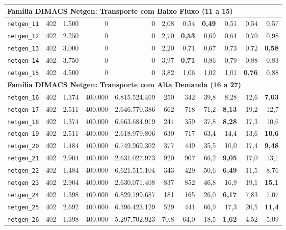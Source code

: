 \begin{longtable}{lrrrrrrrrrr}
\midrule
\multicolumn{11}{l}{\textbf{Família DIMACS Netgen: Transporte com Baixo Fluxo (11 a 15)}} \\
\midrule
\texttt{netgen\_11} & 402 & 1.500 & 0 & 0 & 2,08 & 0,54 & \textbf{0,49} & 0,51 & 0,54 & 0,57 \\
\texttt{netgen\_12} & 402 & 2.250 & 0 & 0 & 2,70 & \textbf{0,53} & 0,69 & 0,64 & 0,70 & 0,98 \\
\texttt{netgen\_13} & 402 & 3.000 & 0 & 0 & 2,20 & 0,71 & 0,67 & 0,73 & 0,72 & \textbf{0,58} \\
\texttt{netgen\_14} & 402 & 3.750 & 0 & 0 & 3,97 & \textbf{0,71} & 0,86 & 0,79 & 0,88 & 0,83 \\
\texttt{netgen\_15} & 402 & 4.500 & 0 & 0 & 3,82 & 1,06 & 1,02 & 1,01 & \textbf{0,76} & 0,88 \\
\midrule
\multicolumn{11}{l}{\textbf{Família DIMACS Netgen: Transporte com Alta Demanda (16 a 27)}} \\
\midrule
\texttt{netgen\_16} & 402 & 1.374 & 400.000 & 6.815.524.469 & 250 & 342 & 39,8 & 8,28 & 12,6 & \textbf{7,03} \\
\texttt{netgen\_17} & 402 & 2.511 & 400.000 & 2.646.770.386 & 662 & 718 & 71,2 & \textbf{8,13} & 19,2 & 12,7 \\
\texttt{netgen\_18} & 402 & 1.374 & 400.000 & 6.663.684.919 & 244 & 359 & 37,8 & \textbf{8,28} & 17,3 & 10,6 \\
\texttt{netgen\_19} & 402 & 2.511 & 400.000 & 2.618.979.806 & 630 & 717 & 63,4 & 14,4 & 13,6 & \textbf{10,6} \\
\texttt{netgen\_20} & 402 & 1.484 & 400.000 & 6.749.969.302 & 377 & 449 & 35,5 & 10,0 & 17,4 & \textbf{9,48} \\
\texttt{netgen\_21} & 402 & 2.904 & 400.000 & 2.631.027.973 & 920 & 907 & 66,2 & \textbf{9,05} & 17,0 & 13,1 \\
\texttt{netgen\_22} & 402 & 1.484 & 400.000 & 6.621.515.104 & 343 & 429 & 50,6 & \textbf{6,49} & 11,5 & 8,76 \\
\texttt{netgen\_23} & 402 & 2.904 & 400.000 & 2.630.071.408 & 837 & 852 & 46,8 & 16,9 & 19,1 & \textbf{15,1} \\
\texttt{netgen\_24} & 402 & 1.398 & 400.000 & 6.829.799.687 & 181 & 165 & 26,0 & \textbf{6,17} & 7,83 & 7,07 \\
\texttt{netgen\_25} & 402 & 2.692 & 400.000 & 6.396.423.129 & 529 & 441 & 66,9 & 17,3 & 20,5 & \textbf{11,4} \\
\texttt{netgen\_26} & 402 & 1.398 & 400.000 & 5.297.702.923 & 70,8 & 64,0 & 18,5 & \textbf{1,62} & 4,52 & 5,09 \\

\end{longtable}
